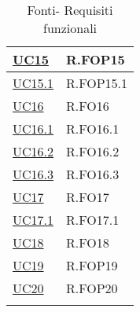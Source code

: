 \begin{longtable}{|P{4,5cm}|>{\arraybackslash}P{9cm}|}
  \hyperref[UC15]{UC15} & R.FOP15 \\
  \hline
  \hyperref[UC15point1]{UC15.1} & R.FOP15.1 \\
  \hline

  \hyperref[UC16]{UC16} & R.FO16 \\
  \hline
  \hyperref[UC16point1]{UC16.1} & R.FO16.1 \\
  \hline
  \hyperref[UC16point2]{UC16.2} & R.FO16.2 \\
  \hline
  \hyperref[UC16point3]{UC16.3} & R.FO16.3 \\
  \hline
  \hyperref[UC17]{UC17} & R.FO17 \\
  \hline
  \hyperref[UC17point1]{UC17.1} & R.FO17.1 \\
  \hline
  \hyperref[UC18]{UC18} & R.FO18 \\
  \hline
  \hyperref[UC19]{UC19} & R.FOP19 \\
  \hline
  \hyperref[UC20]{UC20} & R.FOP20 \\
  \hline
\caption{Fonti- Requisiti funzionali}
\end{longtable}
